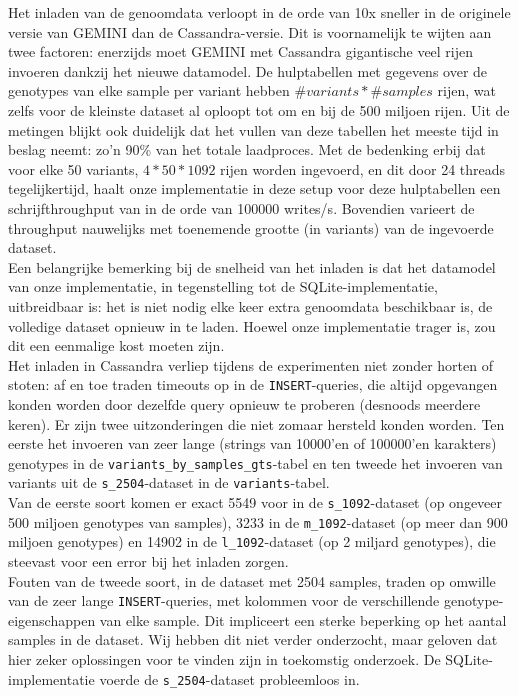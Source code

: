 Het inladen van de genoomdata verloopt in de orde van 10x sneller in de originele versie van GEMINI dan de Cassandra-versie. Dit is voornamelijk te wijten aan twee factoren: enerzijds moet GEMINI met Cassandra gigantische veel rijen invoeren dankzij het nieuwe datamodel. De hulptabellen met gegevens over de genotypes van elke sample per variant hebben $\#variants * \#samples$ rijen, wat zelfs voor de kleinste dataset al oploopt tot om en bij de 500 miljoen rijen. Uit de metingen blijkt ook duidelijk dat het vullen van deze tabellen het meeste tijd in beslag neemt: zo'n 90\% van het totale laadproces. Met de bedenking erbij dat voor elke 50 variants, $4 * 50 * 1092$ rijen worden ingevoerd, en dit door 24 threads tegelijkertijd, haalt onze implementatie in deze setup voor deze hulptabellen een schrijfthroughput van in de orde van 100000 writes/s. Bovendien varieert de throughput nauwelijks met toenemende grootte (in variants) van de ingevoerde dataset.\\
Een belangrijke bemerking bij de snelheid van het inladen is dat het datamodel van onze implementatie, in tegenstelling tot de SQLite-implementatie, uitbreidbaar is: het is niet nodig elke keer extra genoomdata beschikbaar is, de volledige dataset opnieuw in te laden. Hoewel onze implementatie trager is, zou dit een eenmalige kost moeten zijn.\\

Het inladen in Cassandra verliep tijdens de experimenten niet zonder horten of stoten: af en toe traden timeouts op in de \texttt{INSERT}-queries, die altijd opgevangen konden worden door dezelfde query opnieuw te proberen (desnoods meerdere keren). Er zijn twee uitzonderingen die niet zomaar hersteld konden worden. Ten eerste het invoeren van zeer lange (strings van 10000'en of 100000'en karakters) genotypes in de \texttt{variants\_by\_samples\_gts}-tabel en ten tweede het invoeren van variants uit de \texttt{s\_2504}-dataset in de \texttt{variants}-tabel.\\
Van de eerste soort komen er exact 5549 voor in de \texttt{s\_1092}-dataset (op ongeveer 500 miljoen genotypes van samples), 3233 in de \texttt{m\_1092}-dataset (op meer dan 900 miljoen genotypes) en 14902 in de \texttt{l\_1092}-dataset (op 2 miljard genotypes), die steevast voor een error bij het inladen zorgen.\\
Fouten van de tweede soort, in de dataset met 2504 samples, traden op omwille van de zeer lange \texttt{INSERT}-queries, met kolommen voor de verschillende genotype-eigenschappen van elke sample. Dit impliceert een sterke beperking op het aantal samples in de dataset. Wij hebben dit niet verder onderzocht, maar geloven dat hier zeker oplossingen voor te vinden zijn in toekomstig onderzoek. De SQLite-implementatie voerde de \texttt{s\_2504}-dataset probleemloos in.

